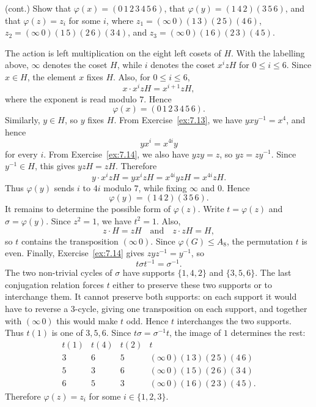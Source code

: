 \documentclass[../Odyssey_Project.tex]{subfiles}
\begin{document}
\begin{exercise}
\label{ex:7.16}
(cont.) Show that $\varphi(x) = (0\, 1\, 2\, 3\, 4\, 5\, 6)$, that $\varphi(y) = (1\, 4\, 2)(3\, 5\, 6)$, and that $\varphi(z) = z_i$ for some $i$, where $z_1 = (\infty\, 0)(1\, 3)(2\, 5)(4\, 6)$, $z_2 = (\infty\, 0)(1\, 5)(2\, 6)(3\, 4)$, and $z_3 = (\infty\, 0)(1\, 6)(2\, 3)(4\, 5)$.
\end{exercise}
\begin{solution}
    The action is left multiplication on the eight left cosets of $H$. With the labelling above, $\infty$ denotes the coset $H$, while $i$ denotes the coset $x^izH$ for $0\leq i\leq 6$. Since $x\in H$, the element $x$ fixes $H$. Also, for $0\leq i\leq 6$,
    \[
        x\cdot x^izH=x^{i+1}zH,
    \]
    where the exponent is read modulo $7$. Hence
    \[
        \varphi(x)=(0\,1\,2\,3\,4\,5\,6).
    \]
    Similarly, $y\in H$, so $y$ fixes $H$. From Exercise~\ref{ex:7.13}, we have $yxy^{-1}=x^4$, and hence
    \[
        yx^i=x^{4i}y
    \]
    for every $i$. From Exercise~\ref{ex:7.14}, we also have $yzy=z$, so $yz=zy^{-1}$. Since $y^{-1}\in H$, this gives $yzH=zH$. Therefore
    \[
        y\cdot x^izH=yx^izH=x^{4i}yzH=x^{4i}zH.
    \]
    Thus $\varphi(y)$ sends $i$ to $4i$ modulo $7$, while fixing $\infty$ and $0$. Hence
    \[
        \varphi(y)=(1\,4\,2)(3\,5\,6).
    \]
    It remains to determine the possible form of $\varphi(z)$. Write $t=\varphi(z)$ and $\sigma=\varphi(y)$. Since $z^2=1$, we have $t^2=1$. Also,
    \[
        z\cdot H=zH
        \quad\text{and}\quad
        z\cdot zH=H,
    \]
    so $t$ contains the transposition $(\infty\,0)$. Since $\varphi(G)\leq A_8$, the permutation $t$ is even. Finally, Exercise~\ref{ex:7.14} gives $zyz^{-1}=y^{-1}$, so
    \[
        t\sigma t^{-1}=\sigma^{-1}.
    \]
    The two non-trivial cycles of $\sigma$ have supports $\{1,4,2\}$ and $\{3,5,6\}$. The last conjugation relation forces $t$ either to preserve these two supports or to interchange them. It cannot preserve both supports: on each support it would have to reverse a $3$-cycle, giving one transposition on each support, and together with $(\infty\,0)$ this would make $t$ odd. Hence $t$ interchanges the two supports.\\
    Thus $t(1)$ is one of $3,5,6$. Since $t\sigma=\sigma^{-1}t$, the image of $1$ determines the rest:
    \[
        \begin{array}{c|c|c|c}
            t(1) & t(4) & t(2) & t\\
            \hline
            3 & 6 & 5 & (\infty\,0)(1\,3)(2\,5)(4\,6)\\
            5 & 3 & 6 & (\infty\,0)(1\,5)(2\,6)(3\,4)\\
            6 & 5 & 3 & (\infty\,0)(1\,6)(2\,3)(4\,5).
        \end{array}
    \]
    Therefore $\varphi(z)=z_i$ for some $i\in\{1,2,3\}$.
\end{solution}
\end{document}
